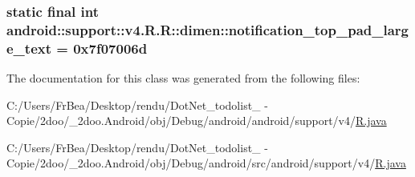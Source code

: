 \hypertarget{classandroid_1_1support_1_1v4_1_1_r_1_1dimen_dcad2c07a68d12c9ea5b3940d8de1053}{
\subsubsection[{notification\_\-top\_\-pad\_\-large\_\-text}]{\setlength{\rightskip}{0pt plus 5cm}static final int android::support::v4.R.R::dimen::notification\_\-top\_\-pad\_\-large\_\-text = 0x7f07006d}}
\label{classandroid_1_1support_1_1v4_1_1_r_1_1dimen_dcad2c07a68d12c9ea5b3940d8de1053}




The documentation for this class was generated from the following files:\begin{CompactItemize}
\item 
C:/Users/FrBea/Desktop/rendu/DotNet\_\-todolist\_ - Copie/2doo/\_\-2doo.Android/obj/Debug/android/android/support/v4/\hyperlink{android_2support_2v4_2_r_8java}{R.java}\item 
C:/Users/FrBea/Desktop/rendu/DotNet\_\-todolist\_ - Copie/2doo/\_\-2doo.Android/obj/Debug/android/src/android/support/v4/\hyperlink{src_2android_2support_2v4_2_r_8java}{R.java}\end{CompactItemize}
